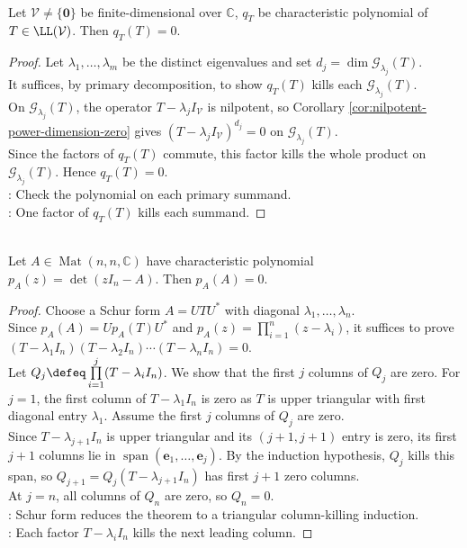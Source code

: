 \begin{theorem} \label{thm:cayley-hamilton-operator} \\
Let $\mathcal{V}\neq\{\mathbf{0}\}$ be finite-dimensional over $\mathbb{C}$, $q_T$ be characteristic polynomial of $T\in\LL(\mathcal{V})$. Then $q_T(T)=0$.
\begin{proof}
Let $\lambda_1,\ldots,\lambda_m$ be the distinct eigenvalues and set $d_j=\dim \mathcal{G}_{\lambda_j}(T)$.\\
It suffices, by primary decomposition, to show $q_T(T)$ kills each $\mathcal{G}_{\lambda_j}(T)$.\\
On $\mathcal{G}_{\lambda_j}(T)$, the operator $T-\lambda_jI_{\mathcal{V}}$ is nilpotent, so Corollary \ref{cor:nilpotent-power-dimension-zero} gives $(T-\lambda_jI_{\mathcal{V}})^{d_j}=0$ on $\mathcal{G}_{\lambda_j}(T)$.\\
Since the factors of $q_T(T)$ commute, this factor kills the whole product on $\mathcal{G}_{\lambda_j}(T)$. Hence $q_T(T)=0$.\\
: Check the polynomial on each primary summand.\\
: One factor of $q_T(T)$ kills each summand.
\end{proof}
\end{theorem}

\begin{theorem} \label{thm:cayley-hamilton-matrix} \\
Let $A\in\operatorname{Mat}(n,n,\mathbb{C})$ have characteristic polynomial $p_A(z)=\det(zI_n-A)$. Then $p_A(A)=0$.
\begin{proof}
Choose a Schur form $A=UTU^*$ with diagonal $\lambda_1,\ldots,\lambda_n$.\\
Since $p_A(A)=Up_A(T)U^*$ and $p_A(z)=\prod_{i=1}^{n}(z-\lambda_i)$, it suffices to prove $(T-\lambda_1I_n)(T-\lambda_2I_n)\cdots(T-\lambda_nI_n)=0$.\\
Let $Q_j\defeq\prod\limits_{i=1}^{j}(T-\lambda_iI_n)$. We show that the first $j$ columns of $Q_j$ are zero. For $j=1$, the first column of $T-\lambda_1I_n$ is zero as $T$ is upper triangular with first diagonal entry $\lambda_1$. Assume the first $j$ columns of $Q_j$ are zero.\\
Since $T-\lambda_{j+1}I_n$ is upper triangular and its $(j+1,j+1)$ entry is zero, its first $j+1$ columns lie in $\operatorname{span}(\mathbf{e}_1,\ldots,\mathbf{e}_j)$. By the induction hypothesis, $Q_j$ kills this span, so $Q_{j+1}=Q_j(T-\lambda_{j+1}I_n)$ has first $j+1$ zero columns.\\
At $j=n$, all columns of $Q_n$ are zero, so $Q_n=0$.\\
: Schur form reduces the theorem to a triangular column-killing induction.\\
: Each factor $T-\lambda_iI_n$ kills the next leading column.
\end{proof}
\end{theorem}

